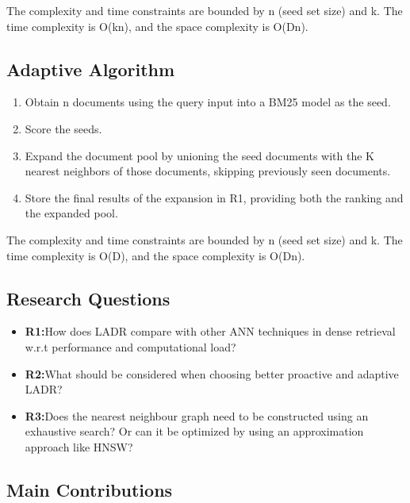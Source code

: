 \documentclass[sigconf,authorversion,nonacm]{acmart}
\begin{document}
The complexity and time constraints are bounded by n (seed set size) and k. The time complexity is
O(kn), and the space complexity is O(Dn).

\subsection{Adaptive Algorithm}

\begin{enumerate}

	\item Obtain n documents using the query input into a BM25 model as the seed.

	\item Score the seeds.

	\item Expand the document pool by unioning the seed documents with the K nearest neighbors of
	      those documents, skipping previously seen documents.

	\item Store the final results of the expansion in R1, providing both the ranking and the
	      expanded pool.

\end{enumerate}

The complexity and time constraints are bounded by n (seed set size) and k. The time complexity is O(D), and the space complexity is O(Dn).

\subsection{Research Questions}

\begin{itemize}

	\item \textbf{R1:}How does LADR compare with other ANN techniques in dense retrieval w.r.t
	      performance and computational load?

	\item \textbf{R2:}What should be considered when choosing better proactive and adaptive LADR?

	\item \textbf{R3:}Does the nearest neighbour graph need to be constructed using an exhaustive
	      search? Or can it be optimized by using an approximation approach like HNSW?

\end{itemize}


\subsection{Main Contributions}
\end{document}
